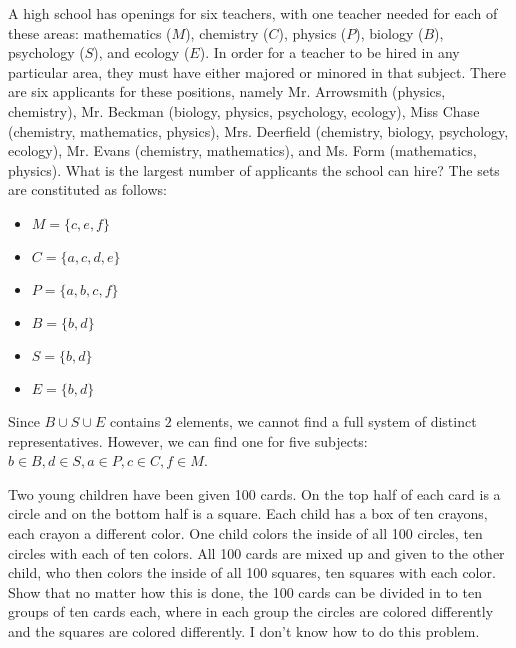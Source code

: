\documentclass[8pt]{extarticle}
\begin{document}
  \begin{problem}{5}
    A high school has openings for six teachers, with one teacher needed for each of these areas: mathematics ($M$), chemistry ($C$), physics ($P$), biology ($B$), psychology ($S$), and ecology ($E$). In order for a teacher to be hired in any particular area, they must have either majored or minored in that subject. There are six applicants for these positions, namely Mr. Arrowsmith (physics, chemistry), Mr. Beckman (biology, physics, psychology, ecology), Miss Chase (chemistry, mathematics, physics), Mrs. Deerfield (chemistry, biology, psychology, ecology), Mr. Evans (chemistry, mathematics), and Ms. Form (mathematics, physics). What is the largest number of applicants the school can hire?
    \tcblower
    The sets are constituted as follows:
    \begin{itemize}
      \item $M = \{c,e,f\}$
      \item $C = \{a,c,d,e\}$
      \item $P = \{a,b,c,f\}$
      \item $B = \{b,d\}$
      \item $S = \{b,d\}$
      \item $E = \{b,d\}$
    \end{itemize}
    Since $B\cup S\cup E$ contains $2$ elements, we cannot find a full system of distinct representatives. However, we can find one for five subjects: $b\in B, d\in S,a\in P,c\in C,f\in M$.
  \end{problem}
  \begin{problem}{6}
    Two young children have been given 100 cards. On the top half of each card is a circle and on the bottom half is a square. Each child has a box of ten crayons, each crayon a different color. One child colors the inside of all 100 circles, ten circles with each of ten colors. All 100 cards are mixed up and given to the other child, who then colors the inside of all 100 squares, ten squares with each color. Show that no matter how this is done, the 100 cards can be divided in to ten groups of ten cards each, where in each group the circles are colored differently and the squares are colored differently.
    \tcblower
    I don't know how to do this problem.
  \end{problem}
\end{document}
